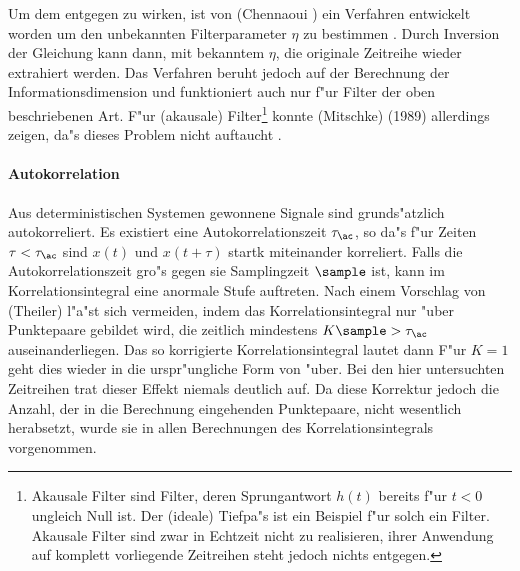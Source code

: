 Um dem entgegen zu wirken, ist von \autor(Chennaoui \etal) ein Verfahren entwickelt worden 
um den unbekannten Filterparameter $\eta$ zu bestimmen \cite{chennaoui}. Durch Inversion der Gleichung
 kann dann, mit bekanntem $\eta$, die originale Zeitreihe wieder
extrahiert werden. Das Verfahren beruht jedoch auf der Berechnung der
Informationsdimension und funktioniert auch nur f"ur Filter der oben beschriebenen
Art. F"ur \begriff(akausale) Filter\footnote{Akausale Filter sind Filter, deren
Sprungantwort $h(t)$ bereits f"ur $t<0$ ungleich Null ist. Der \begriff(ideale) Tiefpa"s
ist ein Beispiel f"ur solch ein Filter. Akausale Filter sind zwar in Echtzeit nicht zu
realisieren, ihrer Anwendung auf komplett vorliegende Zeitreihen steht jedoch nichts
entgegen.} konnte \autor(Mitschke) (1989) allerdings zeigen, da"s dieses Problem nicht 
auftaucht \cite{mitschke}.

\paragraph{Autokorrelation}
\label{corrdimtheiler}
Aus deterministischen Systemen gewonnene Signale sind grunds"atzlich autokorreliert. Es
existiert eine Autokorrelationszeit $\tau_\ac$, so da"s f"ur Zeiten $\tau<\tau_\ac$ sind
$x(t)$ und $x(t+\tau)$ startk miteinander korreliert. Falls die Autokorrelationszeit gro"s 
gegen sie Samplingzeit $\sample$ ist, kann im Korrelationsintegral eine anormale Stufe
auftreten. Nach einem Vorschlag von \autor(Theiler) l"a"st sich vermeiden, indem das
Korrelationsintegral nur "uber Punktepaare  gebildet wird, die zeitlich mindestens
$K\sample>\tau_\ac$ auseinanderliegen. Das so korrigierte Korrelationsintegral lautet dann
F"ur $K=1$ geht dies wieder in die urspr"ungliche Form von  "uber. Bei
den hier untersuchten Zeitreihen trat dieser Effekt niemals deutlich auf. Da diese
Korrektur jedoch die Anzahl, der in die Berechnung eingehenden Punktepaare, nicht
wesentlich herabsetzt, wurde sie in allen Berechnungen des Korrelationsintegrals vorgenommen.

